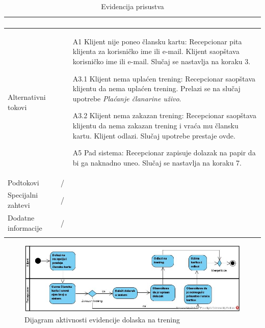 \documentclass[../main.tex]{subfiles}
\begin{document}
\begin{longtable}{| p{} | p{} |}
\begin{enumerate}
    \end{enumerate}\\
\hline
    Alternativni tokovi & \begin{itemize}
        \item[A1] Klijent nije poneo člansku kartu: Recepcionar pita klijenta za korisničko ime ili e-mail. Klijent saopštava korisničko ime ili e-mail. Slučaj se nastavlja na koraku 3.
        \item[A3.1] Klijent nema uplaćen trening: Recepcionar saopštava klijentu da nema uplaćen trening. Prelazi se na slučaj upotrebe \textit{Plaćanje članarine uživo}.
        \item[A3.2] Klijent nema zakazan trening: Recepcionar saopštava klijentu da nema zakazan trening i vraća mu člansku kartu. Klijent odlazi. Slučaj upotrebe prestaje ovde. 
        \item[A5] Pad sistema: Recepcionar zapisuje dolazak na papir da bi ga naknadno uneo. Slučaj se nastavlja na koraku 7.
    \end{itemize}\\
\hline
    Podtokovi & /\\
\hline
    Specijalni zahtevi & /\\
\hline
    Dodatne informacije & /\\
\hline
\caption{Evidencija prisustva} %
\end{longtable}
 
\begin{figure}[!ht]
\begin{center}
\includegraphics[scale=0.55]{sections/images/dijagram_aktivnosti_evidencije_prisustva.jpg}
\end{center}
\caption{Dijagram aktivnosti evidencije dolaska na trening}
\label{fig:kontekst}
\end{figure}
\end{document}
